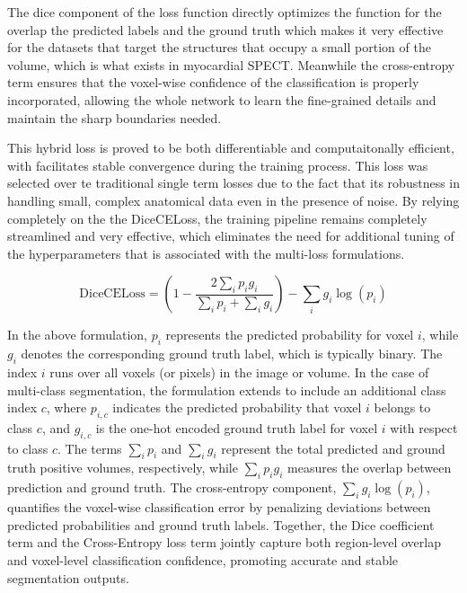 The dice component of the loss function directly optimizes the function for the overlap the predicted labels and the ground truth which makes it very effective for the datasets that target the structures that occupy a small portion of the volume, which is what exists in myocardial SPECT. Meanwhile the cross-entropy term ensures that the voxel-wise confidence of the classification is properly incorporated, allowing the whole network to learn the fine-grained details and maintain the sharp boundaries needed.

This hybrid loss is proved to be both differentiable and computaitonally efficient, with facilitates stable convergence during the training process. This loss was selected over te traditional single term losses due to the fact that its robustness in handling small, complex anatomical data even in the presence of noise. By relying completely on the the DiceCELoss, the training pipeline remains completely streamlined and very effective, which eliminates the need for additional tuning of the hyperparameters that is associated with the multi-loss formulations.

\begin{equation}
\text{DiceCELoss} = \left( 1 - \frac{2 \sum_{i} p_i g_i}{\sum_{i} p_i + \sum_{i} g_i} \right) - \sum_{i} g_i \log(p_i)
\end{equation}

In the above formulation, \( p_i \) represents the predicted probability for voxel \( i \), while \( g_i \) denotes the corresponding ground truth label, which is typically binary. The index \( i \) runs over all voxels (or pixels) in the image or volume. In the case of multi-class segmentation, the formulation extends to include an additional class index \( c \), where \( p_{i,c} \) indicates the predicted probability that voxel \( i \) belongs to class \( c \), and \( g_{i,c} \) is the one-hot encoded ground truth label for voxel \( i \) with respect to class \( c \). The terms \( \sum_i p_i \) and \( \sum_i g_i \) represent the total predicted and ground truth positive volumes, respectively, while \( \sum_i p_i g_i \) measures the overlap between prediction and ground truth. The cross-entropy component, \( \sum_i g_i \log(p_i) \), quantifies the voxel-wise classification error by penalizing deviations between predicted probabilities and ground truth labels. Together, the Dice coefficient term and the Cross-Entropy loss term jointly capture both region-level overlap and voxel-level classification confidence, promoting accurate and stable segmentation outputs.

